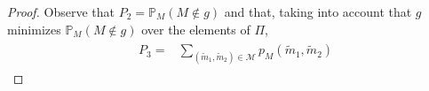\documentclass[journal]{IEEEtran}
\newcommand{\codebookpmf}{p}
\newcommand{\channelOut}{Z}
\newcommand{\channelOutAlph}{\mathcal{Z}}
\newcommand{\channelOutAlphElement}{z}
\newcommand{\channelOutAlphWiretapper}{\channelOutAlph_\mathrm{tap}}
\newcommand{\channelOutAlphElementWiretapper}{\channelOutAlphElement}
\newcommand{\channelOutWiretapper}{\channelOut_\mathrm{tap}}
\newcommand{\codebookOne}{\mathcal{C}_1}
\newcommand{\codebookTwo}{\mathcal{C}_2}
\newcommand{\codebookBlocklength}{n}
\newcommand{\Probability}{\mathbb{P}}
\newcommand{\indicator}[1]{1_{#1}}
\newcommand{\messageRV}{M}
\newcommand{\messageAlphabet}{\mathcal{M}}
\newcommand{\messageAlphabetElement}{m}
\newcommand{\partition}{{\Pi}}
\newcommand{\wiretapperDecoder}{{f}}
\newcommand{\wiretapperGuesser}{{g}}
\newcommand{\semanticErrorTermOne}{{P_2}}
\newcommand{\semanticErrorTermTwo}{{P_3}}
\begin{document}
\begin{proof}
Observe that $\semanticErrorTermOne = \Probability_\messageRV(\messageRV \notin \wiretapperGuesser)$ and that, taking into account that $\wiretapperGuesser$ minimizes $\Probability_\messageRV(\messageRV \notin \wiretapperGuesser)$ over the elements of $\partition$,
\begin{align*}
&
\begin{aligned}
\semanticErrorTermTwo
=
&\sum\limits_{(\tilde{\messageAlphabetElement}_1, \tilde{\messageAlphabetElement}_2) \in \messageAlphabet}
  \codebookpmf_\messageRV(\tilde{\messageAlphabetElement}_1, \tilde{\messageAlphabetElement}_2)

\end{aligned}
\end{align*}
\end{proof}
\end{document}

